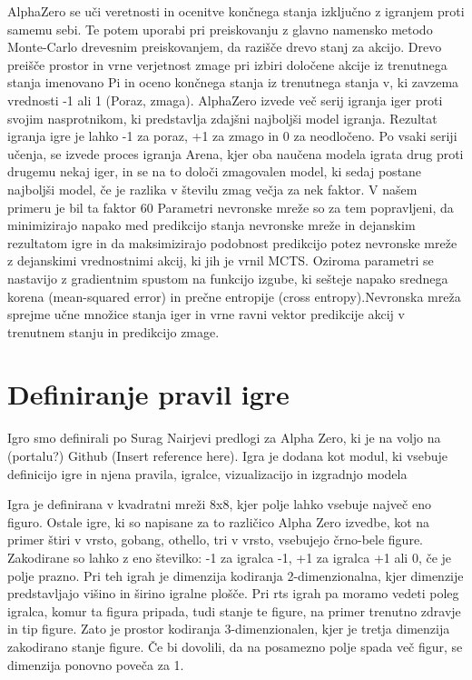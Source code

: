 \documentclass[a4paper, 12pt]{book}
\begin{document}
AlphaZero se uči veretnosti in ocenitve končnega stanja izključno z igranjem proti samemu sebi. 
Te potem uporabi pri preiskovanju z glavno namensko metodo Monte-Carlo drevesnim preiskovanjem, da razišče drevo stanj za akcijo.
Drevo preišče prostor in vrne verjetnost zmage pri izbiri določene akcije iz trenutnega stanja imenovano Pi in oceno končnega stanja iz trenutnega stanja v, ki zavzema vrednosti -1 ali 1 (Poraz, zmaga).
AlphaZero izvede več serij igranja iger proti svojim nasprotnikom, ki predstavlja zdajšni najboljši model igranja.
Rezultat igranja igre je lahko -1 za poraz, +1 za zmago in 0 za neodločeno.
Po vsaki seriji učenja, se izvede proces igranja Arena, kjer oba naučena modela igrata drug proti drugemu nekaj iger, in se na to določi zmagovalen model, ki sedaj postane najboljši model, če je razlika v številu zmag večja za nek faktor. V našem primeru je bil ta faktor 60%
Parametri nevronske mreže so za tem popravljeni, da minimizirajo napako med predikcijo stanja nevronske mreže in dejanskim rezultatom igre in da maksimizirajo podobnost predikcijo potez nevronske mreže z dejanskimi vrednostnimi akcij, ki jih je vrnil MCTS. Oziroma parametri se nastavijo z gradientnim spustom na funkcijo izgube, ki sešteje napako srednega korena (mean-squared error) in prečne entropije (cross entropy).Nevronska mreža sprejme učne množice stanja iger in vrne ravni vektor predikcije akcij v trenutnem stanju in predikcijo zmage.


\chapter{Definiranje pravil igre}
\label{chpravilaigre}

Igro smo definirali po Surag Nairjevi predlogi za Alpha Zero, ki je na voljo na (portalu?) Github (Insert reference here).
Igra je dodana kot modul, ki vsebuje definicijo igre in njena pravila, igralce, vizualizacijo in izgradnjo modela

Igra je definirana v kvadratni mreži 8x8, kjer polje lahko vsebuje največ eno figuro.
Ostale igre, ki so napisane za to različico Alpha Zero izvedbe, kot na primer štiri v vrsto, gobang, othello, tri v vrsto, vsebujejo črno-bele figure.
Zakodirane so lahko z eno številko: -1 za igralca -1, +1 za igralca +1 ali 0, če je polje prazno.
Pri teh igrah je dimenzija kodiranja 2-dimenzionalna, kjer dimenzije predstavljajo višino in širino igralne plošče.
Pri rts igrah pa moramo vedeti poleg igralca, komur ta figura pripada, tudi stanje te figure, na primer trenutno zdravje in tip figure.
Zato je prostor kodiranja 3-dimenzionalen, kjer je tretja dimenzija zakodirano stanje figure.
Če bi dovolili, da na posamezno polje spada več figur, se dimenzija ponovno poveča za 1.
\end{document}
